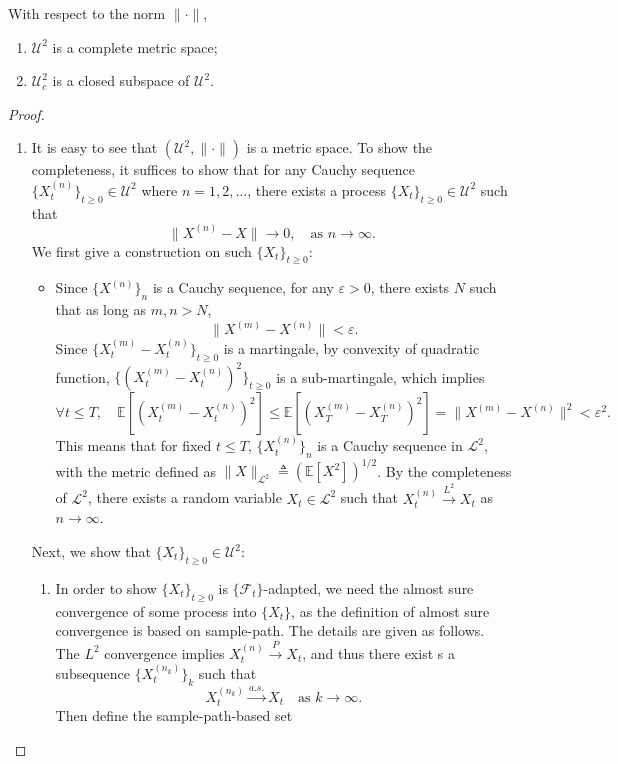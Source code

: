 \begin{theorem}
With respect to the norm $\|\cdot\|$, 
\begin{enumerate}
\item
$\mathcal{U}^2$ is a complete metric space;
\item
$\mathcal{U}_c^2$ is a closed subspace of $\mathcal{U}^2$.
\end{enumerate}
\end{theorem}
\begin{proof}
\begin{enumerate}
\item
It is easy to see that $(\mathcal{U}^2,\|\cdot\|)$ is a metric space.
To show the completeness, it suffices to show that for any Cauchy sequence $\{X_t^{(n)}\}_{t\ge0}\in \mathcal{U}^2$ where $n=1,2,\ldots$, there exists a process $\{X_t\}_{t\ge0}\in\mathcal{U}^2$ such that 
\[
\|X^{(n)}-X\|\to0,\quad \text{as }n\to\infty.
\]
We first give a construction on such $\{X_t\}_{t\ge0}$:
\begin{itemize}
\item
Since $\{X^{(n)}\}_n$ is a Cauchy sequence, for any $\varepsilon>0$, there exists $N$ such that as long as $m,n>N$,
\[
\|X^{(m)}-X^{(n)}\|<\varepsilon.
\]
Since $\{X^{(m)}_t-X^{(n)}_t\}_{t\ge0}$ is a martingale, by convexity of quadratic function,
$\{(X^{(m)}_t-X^{(n)}_t)^2\}_{t\ge0}$ is a sub-martingale, which implies
\[
\forall t\le T,\quad
\mathbb{E}[(X^{(m)}_t-X^{(n)}_t)^2]\le \mathbb{E}[(X^{(m)}_T-X^{(n)}_T)^2]=\|X^{(m)}-X^{(n)}\|^2<\varepsilon^2.
\]
This means that for fixed $t\le T$, $\{X_t^{(n)}\}_{n}$ is a Cauchy sequence in $\mathcal{L}^2$, with the metric defined as $\|X\|_{\mathcal{L}^2}\triangleq\left(\mathbb{E}[X^2]\right)^{1/2}$.
By the completeness of $\mathcal{L}^2$, there exists a random variable $X_t\in\mathcal{L}^2$ such that $X_t^{(n)}\xrightarrow{L^2}X_t$ as $n\to\infty$.
\end{itemize}
Next, we show that $\{X_t\}_{t\ge0}\in\mathcal{U}^2$:
\begin{enumerate}
\item
In order to show $\{X_t\}_{t\ge0}$ is $\{\mathcal{F}_t\}$-adapted, we need the almost sure convergence of some process into $\{X_t\}$, as the definition of almost sure convergence is based on sample-path. The details are given as follows.
The $L^2$ convergence implies $X_t^{(n)}\xrightarrow{P}X_t$, and thus there exist s a subsequence $\{X_t^{(n_k)}\}_k$ such that \[X_t^{(n_k)}\xrightarrow{a.s.}X_t \quad\text{as $k\to\infty$}.\]
Then define the sample-path-based set

\end{enumerate}
\end{enumerate}
\end{proof}
